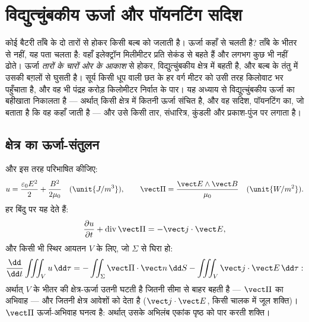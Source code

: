 \chapter{विद्युत्चुंबकीय ऊर्जा और पॉयनटिंग सदिश}\label{ch:b2:poynting-vector}

कोई बैटरी ताँबे के दो तारों से होकर किसी बल्ब को जलाती है। ऊर्जा कहाँ से
चलती है? ताँबे के भीतर से नहीं, यह पता चलता है: वहाँ इलेक्ट्रॉन
मिलीमीटर प्रति सेकंड से बहते हैं और लगभग कुछ भी नहीं ढोते। ऊर्जा
\emph{तारों के चारों ओर के आकाश} से होकर, विद्युत्चुंबकीय क्षेत्र में
बहती है, और बल्ब के तंतु में उसकी बग़लों से घुसती है। सूर्य किसी धूप वाली
छत के हर वर्ग मीटर को उसी तरह किलोवाट भर पहुँचाता है, और वह भी पंद्रह
करोड़ किलोमीटर निर्वात के पार। यह अध्याय  से
विद्युत्चुंबकीय ऊर्जा का बहीखाता निकालता है --- अर्थात् किसी क्षेत्र में
कितनी ऊर्जा संचित है, और वह सदिश, पॉयनटिंग का, जो बताता है कि वह कहाँ
जाती है --- और उसे किसी तार, संधारित्र, कुंडली और प्रकाश-पुंज पर लगाता है।

\section{क्षेत्र का ऊर्जा-संतुलन}

\begin{theorem}[पॉयनटिंग की प्रमेय]\label{thm:b2:poynting-vector:poynting}
\emph{} और \emph{} इस तरह परिभाषित कीजिए:
\[
u = \frac{\varepsilon_0E^2}2 + \frac{B^2}{2\mu_0} \quad (\unit{J/m^3}) , \qquad
\vect\Pi = \frac{\vect E\wedge\vect B}{\mu_0} \quad (\unit{W/m^2}) .
\]
 हर बिंदु पर यह देते हैं:
\[
\frac{\partial u}{\partial t} + \operatorname{div}\vect\Pi = -\vect j\cdot\vect E ,
\]
और किसी भी स्थिर आयतन $V$ के लिए, जो $\Sigma$ से घिरा हो:
\[
\frac{\dd}{\dd t}\iiint_Vu\,\dd\tau = -\iint_\Sigma\vect\Pi\cdot\vect n\,\dd S - \iiint_V\vect j\cdot\vect E\,\dd\tau :
\]
अर्थात् $V$ के भीतर की क्षेत्र-ऊर्जा उतनी घटती है जितनी सीमा से बाहर
बहती है --- $\vect\Pi$ का अभिवाह --- और जितनी क्षेत्र आवेशों को देता है
($\vect j\cdot\vect E$, किसी चालक में जूल शक्ति)। $\vect\Pi$
ऊर्जा-अभिवाह घनत्व है: अर्थात् उसके अभिलंब एकांक पृष्ठ को पार करती
शक्ति।
\end{theorem}


